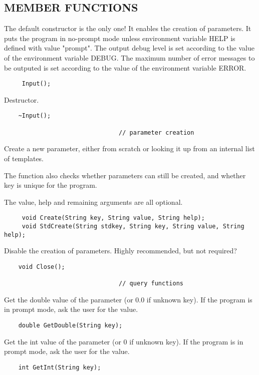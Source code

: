 \subsection*{MEMBER FUNCTIONS}

       The default constructor is the only one!
       It enables the creation of parameters. 
       It puts the program in no-prompt mode unless environment variable
       HELP is defined with value "prompt".
       The output debug level is set according to the value of the
       environment variable DEBUG.
       The maximum number of error messages to be outputed is set according
       to the value of the environment variable ERROR.
\begin{verbatim}
     Input();
\end{verbatim}

       Destructor.
\begin{verbatim}
    ~Input();

                                // parameter creation

\end{verbatim}

       Create a new parameter, either from scratch or looking it
       up from an internal list of templates.
      
       The function also checks whether parameters can still be created,
       and whether key is unique for the program.
      
       The value, help and remaining arguments are all optional.
\begin{verbatim}
     void Create(String key, String value, String help);
     void StdCreate(String stdkey, String key, String value, String help);
\end{verbatim}

       Disable the creation of parameters. Highly recommended, but
       not required?
\begin{verbatim}
    void Close();

                                // query functions
\end{verbatim}

       Get the double value of the parameter (or 0.0 if unknown key).
       If the program is in prompt mode, ask the user for the value.
\begin{verbatim}
    double GetDouble(String key);
\end{verbatim}

       Get the int value of the parameter (or 0 if unknown key).
       If the program is in prompt mode, ask the user for the value.
\begin{verbatim}
    int GetInt(String key);
\end{verbatim}

